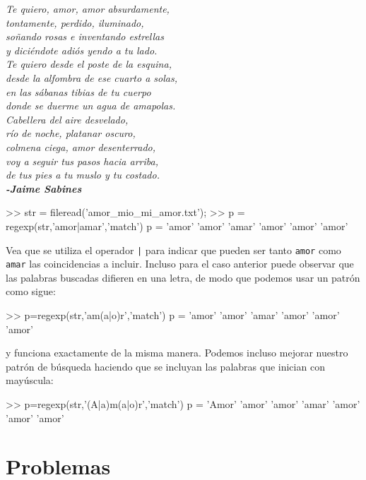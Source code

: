 \emph{Te quiero, amor, amor absurdamente,}\\
\emph{tontamente, perdido, iluminado,}\\
\emph{soñando rosas e inventando estrellas}\\
\emph{y diciéndote adiós yendo a tu lado.} \\

\emph{Te quiero desde el poste de la esquina,}\\
\emph{desde la alfombra de ese cuarto a solas,}\\
\emph{en las sábanas tibias de tu cuerpo}\\
\emph{donde se duerme un agua de amapolas.} \\

\emph{Cabellera del aire desvelado,}\\
\emph{río de noche, platanar oscuro,}\\
\emph{colmena ciega, amor desenterrado,}\\
\emph{voy a seguir tus pasos hacia arriba,}\\
\emph{de tus pies a tu muslo y tu costado.}\\

{\bf\it -Jaime Sabines}

\begin{matlab}
>> str = fileread('amor_mio_mi_amor.txt');
>> p = regexp(str,'amor|amar','match')
p = 
    'amor'    'amor'    'amar'    'amor'    'amor'    'amor'
\end{matlab}

Vea que se utiliza el operador \texttt{|} para indicar que
pueden ser tanto \texttt{amor} como \texttt{amar} las coincidencias a
incluir. Incluso para el caso anterior puede observar que las palabras
buscadas difieren en una letra, de modo que podemos usar un patrón como
sigue:

\begin{matlab}
>> p=regexp(str,'am(a|o)r','match')
p = 
    'amor'    'amor'    'amar'    'amor'    'amor'    'amor'
\end{matlab}

y funciona exactamente de la misma manera. Podemos incluso mejorar
nuestro patrón de búsqueda haciendo que se incluyan las palabras que
inician con mayúscula:

\begin{matlab}
>> p=regexp(str,'(A|a)m(a|o)r','match')
p = 
    'Amor'    'amor'    'amor'    'amar'    'amor'    'amor'    'amor'
\end{matlab}



\section*{Problemas}
